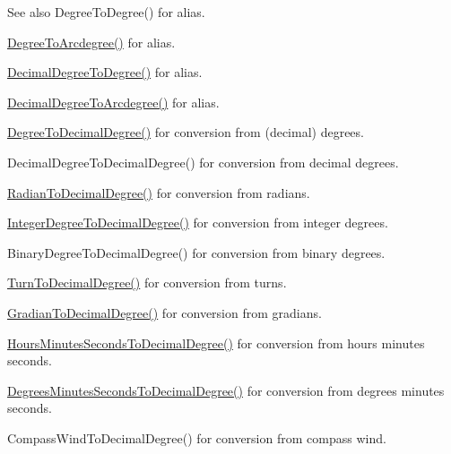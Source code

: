 \begin{DoxySeeAlso}{See also}
Degree\+To\+Degree() for alias. 

\mbox{\hyperlink{group___e_g_x_math-_conversions-_angle_conversions-_degree_gac1b5f3b68f66c77a6df4ceef842c9b19}{Degree\+To\+Arcdegree()}} for alias. 

\mbox{\hyperlink{group___e_g_x_math-_conversions-_angle_conversions-_decimal_degree_ga0aa7f2f5dbb00cf4ab303421c6e33ccf}{Decimal\+Degree\+To\+Degree()}} for alias. 

\mbox{\hyperlink{group___e_g_x_math-_conversions-_angle_conversions-_decimal_degree_gacdd463fcabffeb598ebda65b012ce743}{Decimal\+Degree\+To\+Arcdegree()}} for alias.

\mbox{\hyperlink{group___e_g_x_math-_conversions-_angle_conversions-_degree_ga568afc1d436d425bf5d4edea584aee08}{Degree\+To\+Decimal\+Degree()}} for conversion from (decimal) degrees. 

Decimal\+Degree\+To\+Decimal\+Degree() for conversion from decimal degrees. 

\mbox{\hyperlink{group___e_g_x_math-_conversions-_angle_conversions-_radian_ga6d170f1882c32de53167c04524d05f67}{Radian\+To\+Decimal\+Degree()}} for conversion from radians. 

\mbox{\hyperlink{group___e_g_x_math-_conversions-_angle_conversions-_integer_degree_gac219c3198508ba984d8d81d22831b27d}{Integer\+Degree\+To\+Decimal\+Degree()}} for conversion from integer degrees. 

Binary\+Degree\+To\+Decimal\+Degree() for conversion from binary degrees. 

\mbox{\hyperlink{group___e_g_x_math-_conversions-_angle_conversions-_turn_ga79231536255e77fb7a158b99a30c1767}{Turn\+To\+Decimal\+Degree()}} for conversion from turns. 

\mbox{\hyperlink{group___e_g_x_math-_conversions-_angle_conversions-_gradian_ga346f47c519d5261b689cec49f4a8e789}{Gradian\+To\+Decimal\+Degree()}} for conversion from gradians. 

\mbox{\hyperlink{group___e_g_x_math-_conversions-_angle_conversions-_hours_minutes_seconds_gad6662d1113ae8aea6baca6317888b4cd}{Hours\+Minutes\+Seconds\+To\+Decimal\+Degree()}} for conversion from hours minutes seconds. 

\mbox{\hyperlink{group___e_g_x_math-_conversions-_angle_conversions-_degrees_minutes_seconds_gab4d4c25623f86611692c39eb29f16141}{Degrees\+Minutes\+Seconds\+To\+Decimal\+Degree()}} for conversion from degrees minutes seconds. 

Compass\+Wind\+To\+Decimal\+Degree() for conversion from compass wind. 
\end{DoxySeeAlso}
\mbox{\label{group___e_g_x_math-_conversions-_angle_conversions-_degree_ga859585939255d52d010c780c68eb6e23}} 
